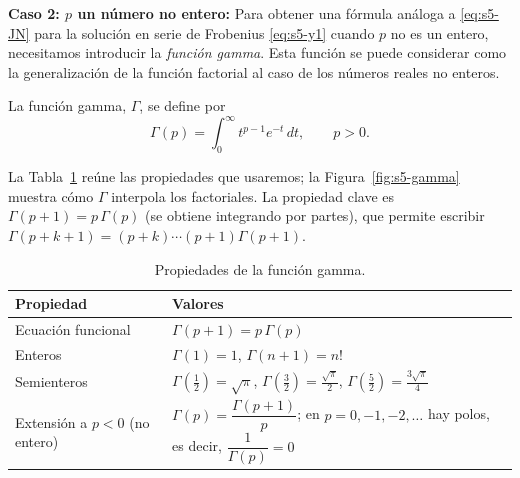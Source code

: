 \vspace{0.3cm}
\noindent \textbf{Caso 2: $p$ un número no entero:} \quad Para obtener una fórmula análoga a \eqref{eq:s5-JN} para la solución en serie de Frobenius \eqref{eq:s5-y1} cuando $p$ no es un entero, necesitamos introducir la \textit{función gamma}. Esta función se puede considerar como la generalización de la función factorial al caso de los números reales no enteros.
 
\begin{definition}
    La función gamma, $\Gamma$, se define por
\[ \Gamma(p) = \int_0^{\infty} t^{p-1} e^{-t} \, dt, \qquad p > 0. \]
\end{definition}
 
La Tabla~\ref{tab:s5-gamma} reúne las propiedades que usaremos; la Figura~\ref{fig:s5-gamma} muestra cómo $\Gamma$ interpola los factoriales. La propiedad clave es $\Gamma(p+1)=p\,\Gamma(p)$ (se obtiene integrando por partes), que permite escribir $\Gamma(p+k+1)=(p+k)\cdots(p+1)\Gamma(p+1)$.
 
\begin{table}[H]
\centering
\small
\caption{Propiedades de la función gamma.}
\label{tab:s5-gamma}
\begin{tabular}{|l|l|}
\hline
\rowcolor{bbe!15}\textbf{Propiedad} & \textbf{Valores} \\ \hline
Ecuación funcional & $\Gamma(p+1)=p\,\Gamma(p)$ \\ \hline
Enteros & $\Gamma(1)=1$, \quad $\Gamma(n+1)=n!$ \\ \hline
Semienteros & $\Gamma(\tfrac12)=\sqrt\pi$, \quad $\Gamma(\tfrac32)=\tfrac{\sqrt\pi}{2}$, \quad $\Gamma(\tfrac52)=\tfrac{3\sqrt\pi}{4}$ \\ \hline
Extensión a $p<0$ (no entero) & $\Gamma(p)=\dfrac{\Gamma(p+1)}{p}$; en $p=0,-1,-2,\dots$ hay polos, es decir, $\dfrac{1}{\Gamma(p)}=0$ \\ \hline
\end{tabular}
\end{table}
 
